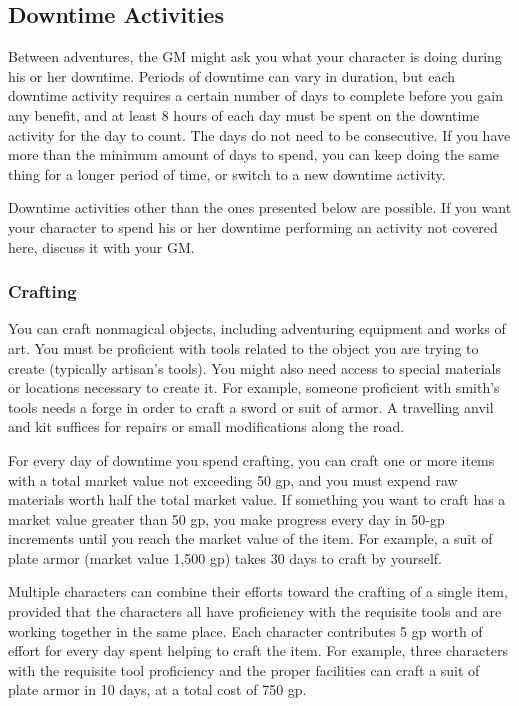 \subsection{Downtime Activities}

Between adventures, the GM might ask you what your character is doing during his or her downtime. Periods of downtime can vary in duration, but each downtime activity requires a certain number of days to complete before you gain any benefit, and at least 8 hours of each day must be spent on the downtime activity for the day to count. The days do not need to be consecutive. If you have more than the minimum amount of days to spend, you can keep doing the same thing for a longer period of time, or switch to a new downtime activity.

Downtime activities other than the ones presented below are possible. If you want your character to spend his or her downtime performing an activity not covered here, discuss it with your GM.

\subsubsection{Crafting}

You can craft nonmagical objects, including adventuring equipment and works of art. You must be proficient with tools related to the object you are trying to create (typically artisan's tools). You might also need access to special materials or locations necessary to create it. For example, someone proficient with smith's tools needs a forge in order to craft a sword or suit of armor. A travelling anvil and kit suffices for repairs or small modifications along the road.

For every day of downtime you spend crafting, you can craft one or more items with a total market value not exceeding 50 gp, and you must expend raw materials worth half the total market value. If something you want to craft has a market value greater than 50 gp, you make progress every day in 50-gp increments until you reach the market value of the item. For example, a suit of plate armor (market value 1,500 gp) takes 30 days to craft by yourself.

Multiple characters can combine their efforts toward the crafting of a single item, provided that the characters all have proficiency with the requisite tools and are working together in the same place. Each character contributes 5 gp worth of effort for every day spent helping to craft the item. For example, three characters with the requisite tool proficiency and the proper facilities can craft a suit of plate armor in 10 days, at a total cost of 750 gp.

